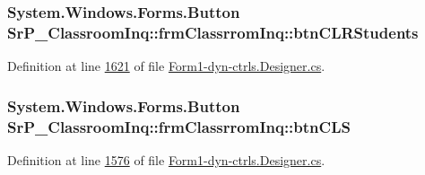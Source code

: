 \hypertarget{class_sr_p___classroom_inq_1_1frm_classrrom_inq_ad2bdef2e6f826a27d003c1a0df8bd2be}{
\subsubsection[{btn\-C\-L\-R\-Students}]{\setlength{\rightskip}{0pt plus 5cm}\-System.\-Windows.\-Forms.\-Button {\bf \-Sr\-P\-\_\-\-Classroom\-Inq\-::frm\-Classrrom\-Inq\-::btn\-C\-L\-R\-Students}}}
\label{class_sr_p___classroom_inq_1_1frm_classrrom_inq_ad2bdef2e6f826a27d003c1a0df8bd2be}


\-Definition at line \hyperlink{_form1-dyn-ctrls_8_designer_8cs_source_l01621}{1621} of file \hyperlink{_form1-dyn-ctrls_8_designer_8cs_source}{\-Form1-\/dyn-\/ctrls.\-Designer.\-cs}.

\hypertarget{class_sr_p___classroom_inq_1_1frm_classrrom_inq_a750ba6df4c36e55bb0b4211c0915d63c}{
\subsubsection[{btn\-C\-L\-S}]{\setlength{\rightskip}{0pt plus 5cm}\-System.\-Windows.\-Forms.\-Button {\bf \-Sr\-P\-\_\-\-Classroom\-Inq\-::frm\-Classrrom\-Inq\-::btn\-C\-L\-S}}}
\label{class_sr_p___classroom_inq_1_1frm_classrrom_inq_a750ba6df4c36e55bb0b4211c0915d63c}


\-Definition at line \hyperlink{_form1-dyn-ctrls_8_designer_8cs_source_l01576}{1576} of file \hyperlink{_form1-dyn-ctrls_8_designer_8cs_source}{\-Form1-\/dyn-\/ctrls.\-Designer.\-cs}.

